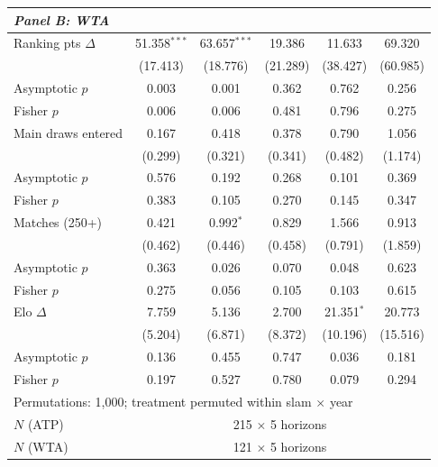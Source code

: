 \begin{tabular}{l ccccc}
\multicolumn{6}{l}{\textit{Panel B: WTA}} \\
\midrule
Ranking pts $\Delta$ & 51.358$^{***}$ & 63.657$^{***}$ & 19.386 & 11.633 & 69.320 \\
  & (17.413) & (18.776) & (21.289) & (38.427) & (60.985) \\
  Asymptotic $p$ & 0.003 & 0.001 & 0.362 & 0.762 & 0.256 \\
  Fisher $p$ & 0.006 & 0.006 & 0.481 & 0.796 & 0.275 \\[0.3em]
Main draws entered & 0.167 & 0.418 & 0.378 & 0.790 & 1.056 \\
  & (0.299) & (0.321) & (0.341) & (0.482) & (1.174) \\
  Asymptotic $p$ & 0.576 & 0.192 & 0.268 & 0.101 & 0.369 \\
  Fisher $p$ & 0.383 & 0.105 & 0.270 & 0.145 & 0.347 \\[0.3em]
Matches (250+) & 0.421 & 0.992$^{*}$ & 0.829 & 1.566 & 0.913 \\
  & (0.462) & (0.446) & (0.458) & (0.791) & (1.859) \\
  Asymptotic $p$ & 0.363 & 0.026 & 0.070 & 0.048 & 0.623 \\
  Fisher $p$ & 0.275 & 0.056 & 0.105 & 0.103 & 0.615 \\[0.3em]
Elo $\Delta$ & 7.759 & 5.136 & 2.700 & 21.351$^{*}$ & 20.773 \\
  & (5.204) & (6.871) & (8.372) & (10.196) & (15.516) \\
  Asymptotic $p$ & 0.136 & 0.455 & 0.747 & 0.036 & 0.181 \\
  Fisher $p$ & 0.197 & 0.527 & 0.780 & 0.079 & 0.294 \\[0.3em]
\midrule
\multicolumn{6}{l}{Permutations: 1,000; treatment permuted within slam $\times$ year} \\
$N$ (ATP) & \multicolumn{5}{c}{215 $\times$ 5 horizons} \\
$N$ (WTA) & \multicolumn{5}{c}{121 $\times$ 5 horizons} \\
\bottomrule
\end{tabular}
